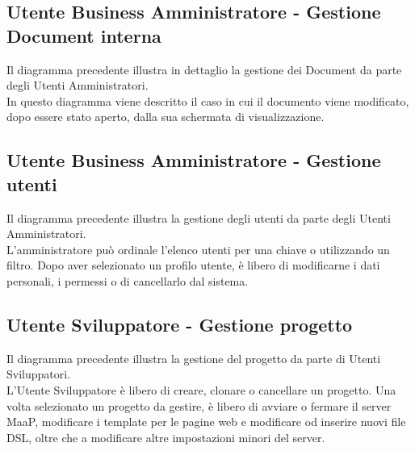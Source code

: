 \subsection{Utente Business Amministratore - Gestione Document interna}
Il diagramma precedente illustra in dettaglio la gestione dei Document da parte degli Utenti Amministratori.\\
In questo diagramma viene descritto il caso in cui il documento viene modificato, dopo essere stato aperto, dalla sua schermata di visualizzazione.

\subsection{Utente Business Amministratore - Gestione utenti}
Il diagramma precedente illustra la gestione degli utenti da parte degli Utenti Amministratori.\\
L'amministratore può ordinale l'elenco utenti per una chiave o utilizzando un filtro. Dopo aver selezionato un profilo utente, è libero di modificarne i dati personali, i permessi o di cancellarlo dal sistema.

\subsection{Utente Sviluppatore - Gestione progetto}
Il diagramma precedente illustra la gestione del progetto da parte di Utenti Sviluppatori.\\
L'Utente Sviluppatore è libero di creare, clonare o cancellare un progetto. Una volta selezionato un progetto da gestire, è libero di avviare o fermare il server MaaP, modificare i template per le pagine web e modificare od inserire nuovi file DSL, oltre che a modificare altre impostazioni minori del server.
